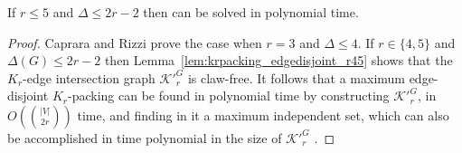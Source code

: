 \begin{thm}
\label{thm:krpacking_edkr345_polytime}
If $r \leq 5$ and $\Delta \leq 2r - 2$ then \edkr can be solved in polynomial time.
\end{thm}
\begin{proof}
Caprara and Rizzi \cite{caprara_packing_2002} prove the case when $r=3$ and $\Delta \leq 4$. If $r \in \{ 4, 5 \}$ and $\Delta(G) \leq 2r - 2$ then Lemma~\ref{lem:krpacking_edgedisjoint_r45} shows that the $K_r$-edge intersection graph ${\mathcal{K}'}_r^G$ is claw-free. It follows that a maximum edge-disjoint $K_r$-packing can be found in polynomial time by constructing ${\mathcal{K}'}_r^G$, in $O(\binom{|V|}{2r})$ time, and finding in it a maximum independent set, which can also be accomplished in time polynomial in the size of ${\mathcal{K}'}_r^G$ \cite{FOS11}.
\end{proof}